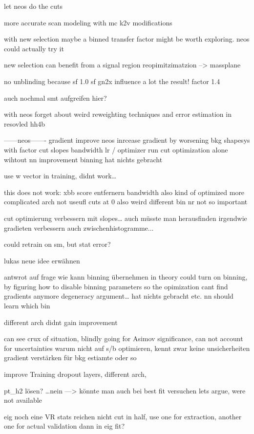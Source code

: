 let neos do the cuts 

more accurate scan modeling with mc k2v modifications 

with new selection maybe a binned transfer factor might be worth exploring.
neos could actually try it

new selection can benefit from a signal region reopimitzimatzion --> massplane


no unblinding because sf
1.0 sf gn2x influence a lot the result! factor 1.4 


auch nochmal smt aufgreifen hier?


with neos forget about weird reweighting techniques and error estimation in resovled hh4b


------neos-------
gradient improve neos
inrcease gradient by worsening bkg shapesys with factor
cut slopes
bandwidth 
lr / optimizer
run cut optimization alone wihtout nn improvement
binning hat nichts gebracht

use w vector in training, didnt work…

this does not work:
xbb score entfernern
bandwidth also kind of optimized
more complicated arch not useufl
cuts at 0 also weird 
different bin nr not so important

cut optimierung verbessern mit slopes… 
auch müsste man herausfinden 
irgendwie gradieten verbessern auch zwischenhistogramme...

could retrain on sm, but stat error?

lukas neue idee erwähnen



antwrot auf frage wie kann binning übernehmen 
in theory could turn on binning, by figuring how to disable binning parameters so the opimization cant find gradients anymore 
degeneracy argument… hat nichts gebracht etc. nn should learn which bin


different arch didnt gain improvement


can see crux of situation, blindly going for Asimov significance, can not account for uncertainties
warum nicht auf s/b optimieren, kennt zwar keine unsicherheiten
gradient verstärken für bkg estiamte oder so


improve Training
dropout layers, different arch, 


pt_h2 lösen? …nein —> könnte man auch bei best fit versuchen
lets argue, were not available

eig noch eine VR
stats reichen nicht 
cut in half, use one for extraction, another one for actual validation dann in eig fit?

